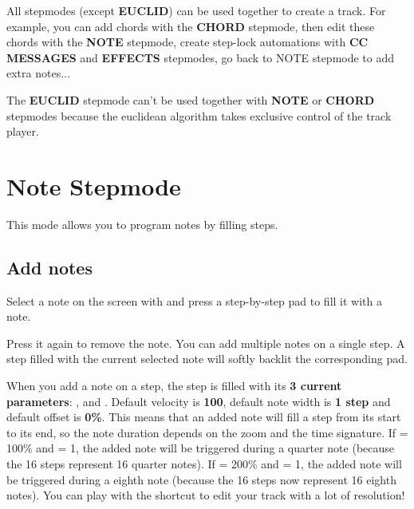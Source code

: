 All stepmodes (except \textbf{EUCLID}) can be used together to create a track. For example, you can add chords with the \textbf{CHORD} stepmode, then edit these chords with the \textbf{NOTE} stepmode, create step-lock automations with \textbf{CC MESSAGES} and \textbf{EFFECTS} stepmodes, go back to NOTE stepmode to add extra notes...

The \textbf{EUCLID} stepmode can't be used together with \textbf{NOTE} or \textbf{CHORD} stepmodes because the euclidean algorithm takes exclusive control of the track player.


\section{Note Stepmode}

This mode allows you to program notes by filling steps.

\subsection{Add notes}
Select a note on the screen with \encodericon{} and press a step-by-step pad \padsicon{} to fill it with a note.


Press it again to remove the note. You can add multiple notes on a single step. A step filled with the current selected note will softly backlit the corresponding pad.



When you add a note on a step, the step is filled with its \textbf{3 current parameters}: ,  and . Default velocity is \textbf{100}, default note width is \textbf{1 step} and default offset is \textbf{0\%}. This means that an added note will fill a step from its start to its end, so the note duration depends on the zoom and the time signature. If  = 100\% and  = 1, the added note will be triggered during a quarter note (because the 16 steps represent 16 quarter notes). If  = 200\% and  = 1, the added note will be triggered during a eighth note (because the 16 steps now represent 16 eighth notes). You can play with the  shortcut to edit your track with a lot of resolution!

